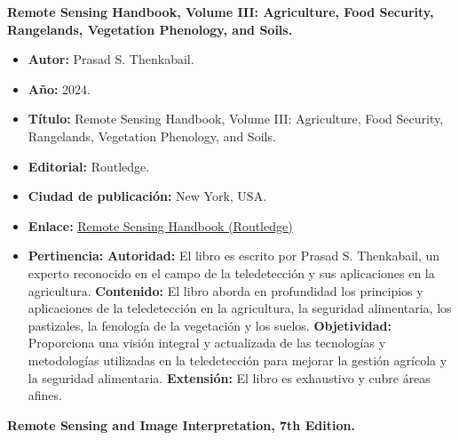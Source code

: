 \textbf{Remote Sensing Handbook, Volume III: Agriculture, Food Security, Rangelands, Vegetation Phenology, and Soils. \cite{Prasad2025}}
\begin{itemize}
   \item \textbf{Autor:} Prasad S. Thenkabail.
   \item \textbf{Año:} 2024.
  \item \textbf{Título:} Remote Sensing Handbook, Volume III: Agriculture, Food Security, Rangelands, Vegetation Phenology, and Soils.
  \item \textbf{Editorial:} Routledge.
  \item \textbf{Ciudad de publicación:} New York, USA.
  \item \textbf{Enlace:} \href{https://www.routledge.com/Remote-Sensing-Handbook--Volume-III-Agriculture-Food-Security-Rangelands-Vegetation-Phenology-and-Soils/Thenkabail/p/book/9781032891019?srsltid=AfmBOorCvB0BBGEuWlFwMJl1JwtfQgzrvdxRbCWGBck_ocSwrZ9dLpRL}{Remote Sensing Handbook (Routledge)}
  \item \textbf{Pertinencia:}
  \subitem \textbf{Autoridad:} El libro es escrito por Prasad S. Thenkabail, un experto reconocido en el campo de la teledetección y sus aplicaciones en la agricultura.
  \subitem \textbf{Contenido:} El libro aborda en profundidad los principios y aplicaciones de la teledetección en la agricultura, la seguridad alimentaria, los pastizales, la fenología de la vegetación y los suelos.
  \subitem \textbf{Objetividad:} Proporciona una visión integral y actualizada de las tecnologías y metodologías utilizadas en la teledetección para mejorar la gestión agrícola y la seguridad alimentaria.
  \subitem \textbf{Extensión:} El libro es exhaustivo y cubre áreas afines.
\end{itemize}

\newpage

\textbf{Remote Sensing and Image Interpretation, 7th Edition. \cite{Lillesand2015}}

